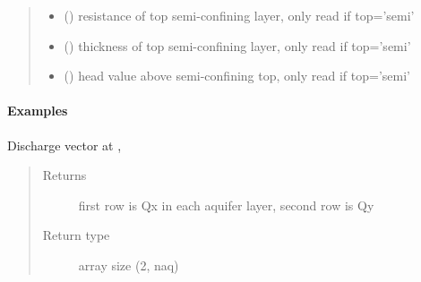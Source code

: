 \documentclass[letterpaper,10pt,english]{sphinxmanual}
\begin{document}
\begin{fulllineitems}
\begin{quote}
\begin{description}
\begin{itemize}
\item {} 
 () \textendash{} resistance of top semi-confining layer, only read if top=’semi’

\item {} 
 () \textendash{} thickness of top semi-confining layer, only read if top=’semi’

\item {} 
 (\sphinxstyleliteralemphasis{ (}\sphinxstyleliteralemphasis{)}) \textendash{} head value above semi-confining top, only read if top=’semi’

\end{itemize}

\end{description}\end{quote}
\paragraph{Examples}

\begin{sphinxVerbatim}[commandchars=\\\{\}]
      
\end{sphinxVerbatim}

\begin{fulllineitems}
\label{\detokenize{models/model3d:timml.model.Model3D.disvec}}
Discharge vector at , 
\begin{quote}\begin{description}
\item[{Returns}] \leavevmode
{} \textendash{} first row is Qx in each aquifer layer, second row is Qy

\item[{Return type}] \leavevmode
array size (2, naq)


\end{description}
\end{quote}
\end{fulllineitems}
\end{fulllineitems}
\end{document}
